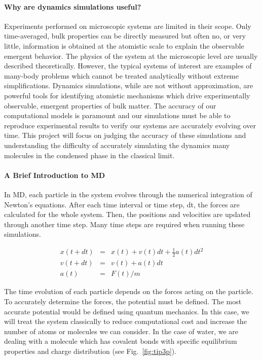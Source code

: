 \documentclass{article}
\begin{document}
\paragraph{Why are dynamics simulations useful?} Experiments performed on microscopic systems are limited in their scope. Only time-averaged, bulk properties can be directly measured but often no, or very little, information is obtained at the atomistic scale to explain the observable emergent behavior. The physics of the system at the microscopic level are usually described theoretically. However, the typical systems of interest are examples of many-body problems which cannot be treated analytically without extreme simplifications. Dynamics simulations, while are not without approximation, are powerful tools for identifying atomistic mechanisms which drive experimentally observable, emergent properties of bulk matter. The accuracy of our computational models is paramount and our simulations must be able to reproduce experimental results to verify our systems are accurately evolving over time. This project will focus on judging the accuracy of these simulations and understanding the difficulty of accurately simulating the dynamics many molecules in the condensed phase in the classical limit.

\paragraph{A Brief Introduction to MD} In MD, each particle in the system evolves through the numerical integration of Newton's equations. After each time interval or time step, dt, the forces are calculated for the whole system. Then, the positions and velocities are updated through another time step. Many time steps are required when running these simulations. 

\begin{eqnarray}
    x(t+dt) &=& x(t) + v(t) dt + \frac{1}{2} a(t) dt^2 \\
    v(t+dt) &=& v(t) + a(t) dt \\
    a(t) &=& F(t)/m
\end{eqnarray}

The time evolution of each particle depends on the forces acting on the particle. To accurately determine the forces, the potential must be defined. The most accurate potential would be defined using quantum mechanics. In this case, we will treat the system classically to reduce computational cost and increase the number of atoms or molecules we can consider. In the case of water, we are dealing with a molecule which has covalent bonds with specific equilibrium properties and charge distribution (see Fig.~\ref{fig:tip3p}).
\end{document}
